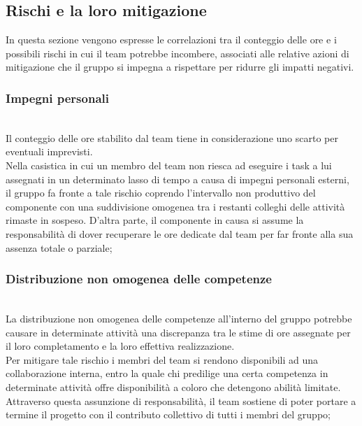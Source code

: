 \documentclass{article}
\begin{document}
{{    
    \subsection{Rischi e la loro mitigazione}
    In questa sezione vengono espresse le correlazioni tra il conteggio delle ore e i possibili rischi in cui il team potrebbe incombere, associati alle relative azioni di mitigazione che il gruppo si impegna a rispettare per ridurre gli impatti negativi.
            \subsubsection{Impegni personali}\\
            Il conteggio delle ore stabilito dal team tiene in considerazione uno scarto per eventuali imprevisti.\\
            Nella casistica in cui un membro del team non riesca ad eseguire i task a lui assegnati in un determinato lasso di tempo a causa di impegni personali esterni, il gruppo fa fronte a tale rischio coprendo l'intervallo non produttivo del componente con una suddivisione omogenea tra i restanti colleghi delle attività rimaste in sospeso. D'altra parte, il componente in causa si assume la responsabilità di dover recuperare le ore dedicate dal team per far fronte alla sua assenza totale o parziale;
            \subsubsection{Distribuzione non omogenea delle competenze}\\
            La distribuzione non omogenea delle competenze all'interno del gruppo potrebbe causare in determinate attività una discrepanza tra le stime di ore assegnate per il loro completamento e la loro effettiva realizzazione.\\
            Per mitigare tale rischio i membri del team si rendono disponibili ad una collaborazione interna, entro la quale chi predilige una certa competenza in determinate attività offre disponibilità a coloro che detengono abilità limitate.
            Attraverso questa assunzione di responsabilità, il team sostiene di poter portare a termine il progetto con il contributo collettivo di tutti i membri del gruppo;
}}
\end{document}
